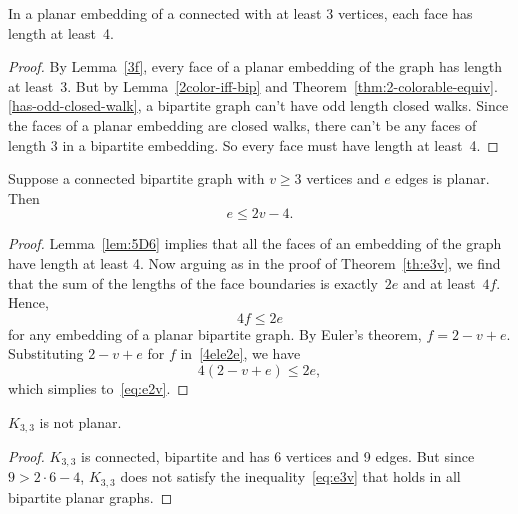 \begin{lemma}\label{lem:5D6}
In a planar embedding of a connected  with at
least 3 vertices, each face has length at least~4.
\end{lemma}

\begin{proof}
  By Lemma~\ref{3f}, every face of a planar embedding of the graph has
  length at least~3.  But by Lemma~\ref{2color-iff-bip} and
  Theorem~\ref{thm:2-colorable-equiv}.\ref{has-odd-closed-walk}, a
    bipartite graph can't have odd length closed walks.  Since the faces
    of a planar embedding are closed walks, there can't be any faces of
    length 3 in a bipartite embedding.  So every face must have length at
    least~4.
\end{proof}

\begin{theorem}\label{th:e2v}
Suppose a connected bipartite graph with $v \geq 3$ vertices and $e$ edges
is planar.  Then
\begin{equation}\label{eq:e2v}
    e \leq 2v-4.
\end{equation}
\end{theorem}

\begin{proof}
  Lemma~\ref{lem:5D6} implies that all the faces of an embedding of the
  graph have length at least 4.  Now arguing as in the proof of
  Theorem~\ref{th:e3v}, we find that the sum of the lengths of the face
  boundaries is exactly~$2e$ and at least~$4f$.  Hence,
\begin{equation}\label{4ele2e}
    4f \le 2e
\end{equation}
for any embedding of a planar bipartite graph.  By Euler's theorem,
$f=2-v+e$.  Substituting $2-v+e$ for $f$ in~\eqref{4ele2e}, we have
\[
4(2-v+e) \leq 2e,
\]
which simplies to~\eqref{eq:e2v}.
\end{proof}

\begin{corollary}\label{cor:K33-nonplanar} %
$K_{3, 3}$ is not planar.
\end{corollary}

\begin{proof}
  $K_{3,3}$ is connected, bipartite and has 6 vertices and 9 edges.  But
  since $ 9 > 2 \cdot 6-4$, $K_{3,3}$ does not satisfy the
  inequality~\eqref{eq:e3v} that holds in all bipartite planar graphs.
\end{proof}

